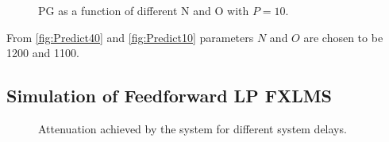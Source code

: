 \begin{figure}[H]
	\centering
	
	\caption{PG as a function of different N and O with $P=10$.}
	\label{fig:Predict10}
\end{figure}

From \autoref{fig:Predict40} and \autoref{fig:Predict10} parameters $N$ and $O$ are chosen to be 1200 and 1100.
\subsection{Simulation of Feedforward LP FXLMS}


\begin{figure}[H]
	\centering
	
	\caption{Attenuation achieved by the system for different system delays.}
	\label{Fig:Reference to noise ratio}
\end{figure}














